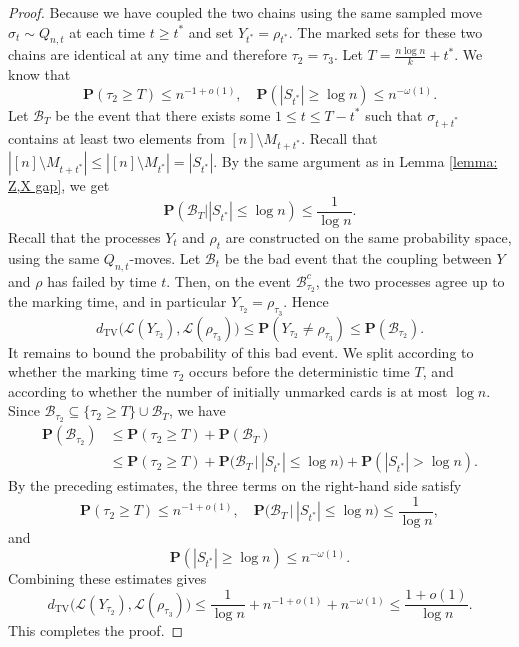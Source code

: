 \begin{proof}
    Because we have coupled the two chains using the same sampled move $\sigma_t \sim Q_{n,t}$ at each time $t \geq t^*$ and set $Y_{t^*} = \rho_{t^*}$. The marked sets for these two chains are identical at any time and therefore $\tau_2 = \tau_3$.   
    Let $T = \frac{n \log n}{k} + t^*$. We know that
    \[
    \mathbf{P}\left(\tau_2  \geq T \right) \leq n^{-1+o(1)},\quad \mathbf{P}(|S_{t^*}| \geq \log n) \leq n ^{- \omega(1)}.
    \]
    Let $\mathcal{B}_T$ be the event that there exists some $1 \leq t \leq T - t^*$ such that $\sigma_{t+t^*}$ contains at least two elements from $[n] \setminus M_{t+t^*}$. Recall that $|[n] \setminus M_{t+t^*}| \leq |[n] \setminus M_{t^*}| = |S_{t^*}|$. By the same argument as in Lemma \ref{lemma: Z,X gap}, we get
    \[
    \mathbf{P} \left( \mathcal{B}_T \bigg| |S_{t^*}| \leq \log n \right) \leq \frac{1}{\log n}.
    \]
Recall that the processes \(Y_t\) and \(\rho_t\) are constructed on the same probability space, using the same \(Q_{n,t}\)-moves. Let \(\mathcal{B}_t\) be the bad event that the coupling between \(Y\) and \(\rho\) has failed by time \(t\). Then, on the event \(\mathcal{B}_{\tau_2}^c\), the two processes agree up to the marking time, and in particular \(Y_{\tau_2}=\rho_{\tau_3}\). Hence
$$
d_{\mathrm{TV}}\bigl(\mathcal L(Y_{\tau_2}),\mathcal L(\rho_{\tau_3})\bigr)
\leq
\mathbf P(Y_{\tau_2}\neq \rho_{\tau_3})
\leq
\mathbf P(\mathcal{B}_{\tau_2}).
$$
It remains to bound the probability of this bad event. We split according to whether the marking time \(\tau_2\) occurs before the deterministic time \(T\), and according to whether the number of initially unmarked cards is at most \(\log n\). Since \(\mathcal{B}_{\tau_2}\subseteq \{\tau_2\geq T\}\cup \mathcal{B}_T\), we have
$$
\begin{aligned}
    \mathbf P(\mathcal{B}_{\tau_2})
    &\leq
    \mathbf P(\tau_2\geq T)+\mathbf P(\mathcal{B}_T) \\
    &\leq
    \mathbf P(\tau_2\geq T)
    +\mathbf P\bigl(\mathcal{B}_T\,\big|\, |S_{t^*}|\leq \log n\bigr)
    +\mathbf P(|S_{t^*}|>\log n).
\end{aligned}
$$
By the preceding estimates, the three terms on the right-hand side satisfy
$$
\mathbf P(\tau_2\geq T)\leq n^{-1+o(1)}, \quad\mathbf P\bigl(\mathcal{B}_T\,\big|\, |S_{t^*}|\leq \log n\bigr)\leq \frac{1}{\log n},
$$
and
$$
\mathbf P(|S_{t^*}|\geq \log n)\leq n^{-\omega(1)}.
$$
Combining these estimates gives
$$
d_{\mathrm{TV}}\bigl(\mathcal L(Y_{\tau_2}),\mathcal L(\rho_{\tau_3})\bigr)\leq\frac{1}{\log n}+n^{-1+o(1)}+n^{-\omega(1)}\leq\frac{1+o(1)}{\log n}.
$$
This completes the proof.
\end{proof}

